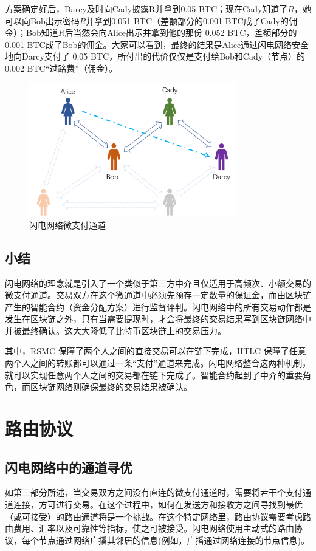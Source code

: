 \documentclass[12pt,a4paper]{article}
\begin{document}
方案确定好后，Darcy及时向Cady披露R并拿到0.05 BTC；现在Cady知道了$R$，她可以向Bob出示密码$R$并拿到0.051 BTC（差额部分的0.001 BTC成了Cady的佣金）；Bob知道$R$后当然会向Alice出示并拿到他的那份 0.052 BTC，差额部分的 0.001 BTC成了Bob的佣金。大家可以看到，最终的结果是Alice通过闪电网络安全地向Darcy支付了 0.05 BTC，所付出的代价仅仅是支付给Bob和Cady（节点）的 0.002 BTC“过路费”（佣金）。

\begin{figure}[htb]
\centering
\includegraphics[width=9cm]{channels}
\caption{闪电网络微支付通道}
\end{figure}

\subsection{小结}
闪电网络的理念就是引入了一个类似于第三方中介且仅适用于高频次、小额交易的微支付通道。交易双方在这个微通道中必须先预存一定数量的保证金，而由区块链产生的智能合约（资金分配方案）进行监督评判。闪电网络中的所有交易动作都是发生在区块链之外，只有当需要提现时，才会将最终的交易结果写到区块链网络中并被最终确认。这大大降低了比特币区块链上的交易压力。

其中，RSMC 保障了两个人之间的直接交易可以在链下完成，HTLC 保障了任意两个人之间的转账都可以通过一条“支付”通道来完成。闪电网络整合这两种机制，就可以实现任意两个人之间的交易都在链下完成了。智能合约起到了中介的重要角色，而区块链网络则确保最终的交易结果被确认。

\section{路由协议}
\subsection{闪电网络中的通道寻优}
如第三部分所述，当交易双方之间没有直连的微支付通道时，需要将若干个支付通道连接，方可进行交易。在这个过程中，如何在发送方和接收方之间寻找到最优（或可接受）的路由通道将是一个挑战。在这个特定网络里，路由协议需要考虑路由费用、汇率以及可靠性等指标，使之可被接受。闪电网络使用主动式的路由协议，每个节点通过网络广播其邻居的信息(例如，广播通过网络连接的节点信息)。
\end{document}
